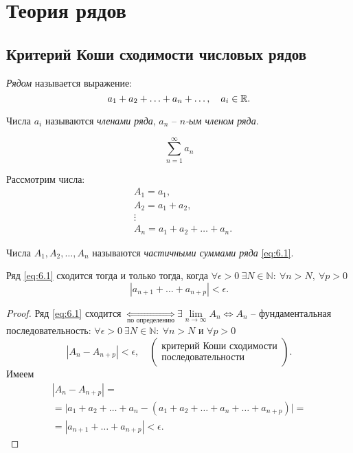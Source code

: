 \section{Теория рядов}

\setcounter{subsection}{30}

\subsection{Критерий Коши сходимости числовых рядов}

\begin{definition}[Ряд]
    \emph{Рядом} называется выражение:
    \[
        a_1 + a_2 + \ldots + a_n + \ldots, \quad a_i \in \mathbb{R}.
    \]

    Числа $ a_i $ называются \emph{членами ряда}, $ a_n $ -- \emph{$ n $-ым членом ряда}.

    \begin{equation}\label{eq:6.1}
        \sum_{n=1}^{\infty}a_n
    \end{equation}

    Рассмотрим числа:
    \begin{align*}
         & A_1 = a_1,                      \\
         & A_2 = a_1 + a_2,                \\
         & \vdots                          \\
         & A_n = a_1 + a_2 + \ldots + a_n.
    \end{align*}

    Числа $ A_1,A_2,\ldots,A_n $ называются \emph{частичными суммами ряда} \ref{eq:6.1}.
\end{definition}

\begin{theorem}
    Ряд \ref{eq:6.1} сходится тогда и только тогда, когда $\forall \epsilon > 0 \ \exists N \in \mathbb{N}: \ \forall n > N, \ \forall p > 0$
    \[
        |a_{n+1} + \ldots + a_{n+p}| < \epsilon.
    \]
\end{theorem}

\begin{proof}
    Ряд \ref{eq:6.1} сходится $\underset{\text{по определению}}{\iff} \exists \underset{n\rightarrow\infty}{\lim}A_n \iff A_n$ -- фундаментальная последовательность: $\forall \epsilon > 0 \ \exists N \in \mathbb{N}: \ \forall n > N$ и $\forall p > 0$
    \[
        |A_n - A_{n+p}| < \epsilon, \quad \left(\begin{array}{c}
                \text{критерий Коши сходимости} \\
                \text{последовательности}
            \end{array}\right).
    \]
    Имеем
    \begin{multline*}
        |A_n - A_{n+p}| = \\
        =\big|a_1 + a_2 + \ldots + a_n - (a_1 + a_2 + \ldots + a_n + \ldots + a_{n+p})\big| = \\
        = |a_{n+1} + \ldots + a_{n+p}| < \epsilon.
    \end{multline*}
\end{proof}

